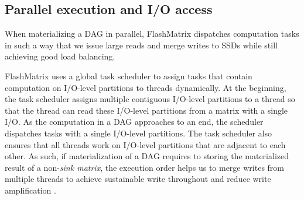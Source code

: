 
\subsection{Parallel execution and I/O access}
When materializing a DAG in parallel, FlashMatrix dispatches computation tasks
in such a way that we issue large reads and merge writes to SSDs while still
achieving good load balancing.

FlashMatrix uses a global task scheduler to assign tasks that contain
computation on I/O-level partitions to threads dynamically. At the beginning,
the task scheduler assigns multiple contiguous I/O-level partitions to a thread
so that the thread can read these I/O-level partitions from a matrix with
a single I/O. As the computation in a DAG approaches to an end, the scheduler
dispatches tasks with a single I/O-level partitions. The task scheduler also
ensures that all threads work on I/O-level partitions that are adjacent to
each other. As such, if materialization of a DAG requires to storing the materialized
result of a non-\textit{sink matrix}, the execution order helps us to merge
writes from multiple threads to achieve sustainable write throughout and reduce
write amplification \cite{}.

